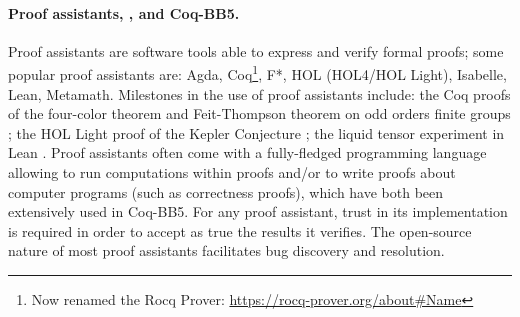 \documentclass[a4paper,british]{article}
\theoremstyle{definition} %
\numberwithin{equation}{section}
\theoremstyle{definition} %
\newcommand{\ts}[1]{{\color{red}#1}}
\newcommand{\CoqBB}{Coq-BB5\xspace}
\begin{document}

\paragraph{Proof assistants, \Coq, and \CoqBB.} Proof assistants are software tools able to express and verify formal proofs; some popular proof assistants are: Agda, Coq\footnote{Now renamed the Rocq Prover: \url{https://rocq-prover.org/about\#Name}}, F*, HOL (HOL4/HOL Light), Isabelle, Lean, Metamath. Milestones in the use of proof assistants include: the Coq proofs of the four-color theorem \cite{gonthier2008formal, gonthier2023computer} and Feit-Thompson theorem on odd orders finite groups \cite{gonthier2013machine}; the HOL Light proof of the Kepler Conjecture \cite{3fdf2c9143a54629bba02e34f24c7698}; the liquid tensor experiment in Lean \cite{2309.14870,LeanCommunityLTE2022}. Proof assistants often come with a fully-fledged programming language allowing to run computations within proofs and/or to write proofs about computer programs (such as correctness proofs), which have both been extensively used in \CoqBB. For any proof assistant, trust in its implementation is required in order to accept as true the results it verifies. The open-source nature of most proof assistants facilitates bug discovery and resolution.
\end{document}
